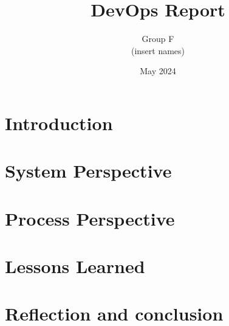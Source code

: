 \documentclass[12pt,a4paper]{report}
\title{DevOps Report}
\author{Group F \\ (insert names)}
\date{May 2024}
\begin{document}
\maketitle
\tableofcontents
\listoffigures

\chapter{Introduction}


\chapter{System Perspective}


\chapter{Process Perspective}







\chapter{Lessons Learned}


\chapter{Reflection and conclusion}


\end{document}
